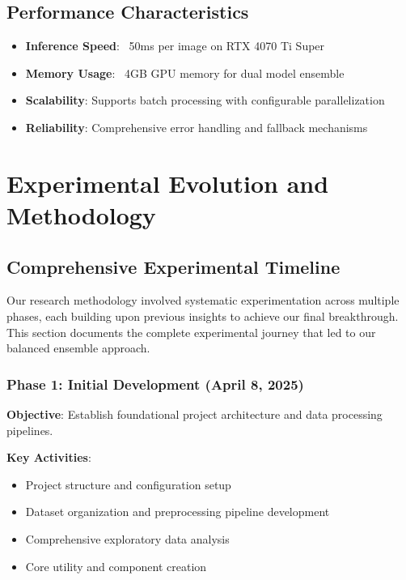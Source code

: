\documentclass[12pt]{article}
\begin{document}
\subsection{Performance Characteristics}

\begin{itemize}[itemsep=1pt,parsep=0pt,topsep=3pt]
\item \textbf{Inference Speed}: ~50ms per image on RTX 4070 Ti Super
\item \textbf{Memory Usage}: ~4GB GPU memory for dual model ensemble
\item \textbf{Scalability}: Supports batch processing with configurable parallelization
\item \textbf{Reliability}: Comprehensive error handling and fallback mechanisms
\end{itemize}

\section{Experimental Evolution and Methodology}

\subsection{Comprehensive Experimental Timeline}

Our research methodology involved systematic experimentation across multiple phases, each building upon previous insights to achieve our final breakthrough. This section documents the complete experimental journey that led to our balanced ensemble approach.

\subsubsection{Phase 1: Initial Development (April 8, 2025)}

\textbf{Objective}: Establish foundational project architecture and data processing pipelines.

\textbf{Key Activities}:
\begin{itemize}[itemsep=1pt,parsep=0pt,topsep=2pt]
\item Project structure and configuration setup
\item Dataset organization and preprocessing pipeline development
\item Comprehensive exploratory data analysis
\item Core utility and component creation
\end{itemize}
\end{document}

